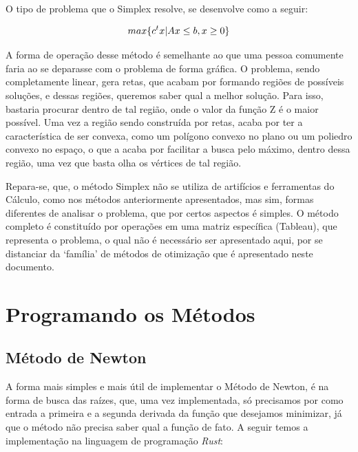 O tipo de problema que o Simplex resolve, se desenvolve como a seguir:

\begin{equation}
        max \{c^tx | Ax \leq b, x \geq 0\}\\
\end{equation}


A forma de operação desse método é semelhante ao que uma pessoa comumente faria
ao se deparasse com o problema de forma gráfica. O problema, sendo
completamente linear, gera retas, que acabam por formando regiões de
possíveis soluções, e dessas regiões, queremos saber qual a melhor solução.
Para isso, bastaria procurar dentro de tal região, onde o valor da função Z é o
maior possível. Uma vez a região sendo construída por retas, acaba por
ter a característica de ser convexa, como um polígono convexo no plano ou um
poliedro convexo no espaço, o que a acaba por facilitar a busca pelo máximo,
dentro dessa região, uma vez que basta olha os vértices de tal região.

Repara-se, que, o método Simplex não se utiliza de artifícios e ferramentas do
Cálculo, como nos métodos anteriormente apresentados, mas sim, formas
diferentes de analisar o problema, que por certos aspectos é simples. O método
completo é constituído por operações em uma matriz específica (Tableau), que
representa o problema, o qual não é necessário ser apresentado aqui, por se
distanciar da `família' de métodos de otimização que é apresentado neste
documento.



\section{{Programando os Métodos}}

\hspace{0.8cm}

\subsection{Método de Newton}

\hspace{0.8cm}
A forma mais simples e mais útil de implementar o Método de Newton, é na forma
de busca das raízes, que, uma vez implementada, só precisamos por como entrada
a primeira e a segunda derivada da função que desejamos minimizar, já que o
método não precisa saber qual a função de fato. A seguir temos a implementação
na linguagem de programação \textit{Rust}:
\vspace{0.2cm}


